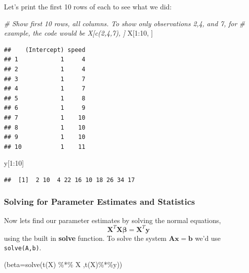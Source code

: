 \documentclass[
]{article}
\newenvironment{Shaded}{\begin{snugshade}}{\end{snugshade}}
\newcommand{\AttributeTok}[1]{\textcolor[rgb]{0.77,0.63,0.00}{#1}}
\newcommand{\CommentTok}[1]{\textcolor[rgb]{0.56,0.35,0.01}{\textit{#1}}}
\newcommand{\DecValTok}[1]{\textcolor[rgb]{0.00,0.00,0.81}{#1}}
\newcommand{\FunctionTok}[1]{\textcolor[rgb]{0.00,0.00,0.00}{#1}}
\newcommand{\NormalTok}[1]{#1}
\newcommand{\SpecialCharTok}[1]{\textcolor[rgb]{0.00,0.00,0.00}{#1}}
\theoremstyle{definition}
\theoremstyle{definition}
\theoremstyle{definition}
\theoremstyle{definition}
\theoremstyle{remark}
\begin{document}
Let's print the first 10 rows of each to see what we did:

\begin{Shaded}
\begin{Highlighting}[]
\CommentTok{\# Show first 10 rows, all columns. To show only observations 2,4, and 7, for}
\CommentTok{\# example, the code would be X[c(2,4,7), ]}
\NormalTok{X[}\DecValTok{1}\SpecialCharTok{:}\DecValTok{10}\NormalTok{, ]}
\end{Highlighting}
\end{Shaded}

\begin{verbatim}
##    (Intercept) speed
## 1            1     4
## 2            1     4
## 3            1     7
## 4            1     7
## 5            1     8
## 6            1     9
## 7            1    10
## 8            1    10
## 9            1    10
## 10           1    11
\end{verbatim}

\begin{Shaded}
\begin{Highlighting}[]
\NormalTok{y[}\DecValTok{1}\SpecialCharTok{:}\DecValTok{10}\NormalTok{]}
\end{Highlighting}
\end{Shaded}

\begin{verbatim}
##  [1]  2 10  4 22 16 10 18 26 34 17
\end{verbatim}

\hypertarget{solving-for-parameter-estimates-and-statistics}{%
\subsubsection{Solving for Parameter Estimates and Statistics}\label{solving-for-parameter-estimates-and-statistics}}

Now lets find our parameter estimates by solving the normal equations,
\[\mathbf{X}^T\mathbf{X}\boldsymbol\beta = \mathbf{X}^T\mathbf{y}\]
using the built in \textbf{solve} function. To solve the system \(\mathbf{A}\mathbf{x}=\mathbf{b}\) we'd use \texttt{solve(A,b)}.

\begin{Shaded}
\begin{Highlighting}[]
\NormalTok{(}\AttributeTok{beta=}\FunctionTok{solve}\NormalTok{(}\FunctionTok{t}\NormalTok{(X) }\SpecialCharTok{\%*\%}\NormalTok{ X ,}\FunctionTok{t}\NormalTok{(X)}\SpecialCharTok{\%*\%}\NormalTok{y))}
\end{Highlighting}
\end{Shaded}
\end{document}
